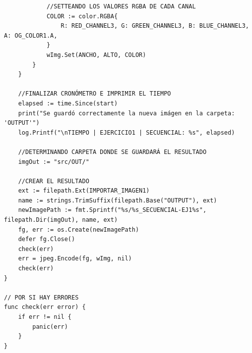 \documentclass{article}
\begin{document}
\begin{verbatim}
			//SETTEANDO LOS VALORES RGBA DE CADA CANAL
			COLOR := color.RGBA{
				R: RED_CHANNEL3, G: GREEN_CHANNEL3, B: BLUE_CHANNEL3, A: OG_COLOR1.A,
			}
			wImg.Set(ANCHO, ALTO, COLOR)
		}
	}

	//FINALIZAR CRONÓMETRO E IMPRIMIR EL TIEMPO
	elapsed := time.Since(start)
	print("Se guardó correctamente la nueva imágen en la carpeta: 'OUTPUT'")
	log.Printf("\nTIEMPO | EJERCICIO1 | SECUENCIAL: %s", elapsed)

	//DETERMINANDO CARPETA DONDE SE GUARDARÁ EL RESULTADO
	imgOut := "src/OUT/"

	//CREAR EL RESULTADO
	ext := filepath.Ext(IMPORTAR_IMAGEN1)
	name := strings.TrimSuffix(filepath.Base("OUTPUT"), ext)
	newImagePath := fmt.Sprintf("%s/%s_SECUENCIAL-EJ1%s", filepath.Dir(imgOut), name, ext)
	fg, err := os.Create(newImagePath)
	defer fg.Close()
	check(err)
	err = jpeg.Encode(fg, wImg, nil)
	check(err)
}

// POR SI HAY ERRORES
func check(err error) {
	if err != nil {
		panic(err)
	}
}

\end{verbatim}
\end{document}
